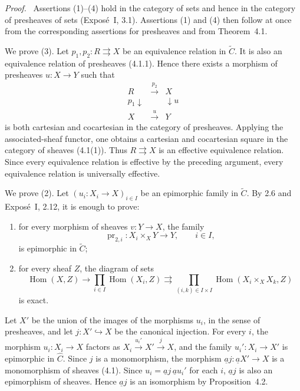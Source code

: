 \documentclass[11pt]{article}
\newcommand{\Hom}{\operatorname{Hom}}
\newenvironment{prooftext}{\par\noindent\emph{Proof.}\ }{\par\medskip}
\begin{document}
\begin{prooftext}
Assertions (1)--(4) hold in the category of sets and hence in the category of presheaves of sets (Expos\'e~I, 3.1). Assertions (1) and (4) then follow at once from the corresponding assertions for presheaves and from Theorem~4.1.

We prove (3). Let \(p_1,p_2:R\rightrightarrows X\) be an equivalence relation in \(\widetilde C\). It is also an equivalence relation of presheaves (4.1.1). Hence there exists a morphism of presheaves \(u:X\to Y\) such that
\[
\begin{array}{ccc}
R&\xrightarrow{p_2}&X\\
{\scriptstyle p_1}\downarrow&&\downarrow{\scriptstyle u}\\
X&\xrightarrow{u}&Y
\end{array}
\]
is both cartesian and cocartesian in the category of presheaves. Applying the associated-sheaf functor, one obtains a cartesian and cocartesian square in the category of sheaves (4.1(1)). Thus \(R\rightrightarrows X\) is an effective equivalence relation. Since every equivalence relation is effective by the preceding argument, every equivalence relation is universally effective.

We prove (2). Let \((u_i:X_i\to X)_{i\in I}\) be an epimorphic family in \(\widetilde C\). By 2.6 and Expos\'e~I, 2.12, it is enough to prove:
\begin{enumerate}[label=\alph*)]
\item for every morphism of sheaves \(v:Y\to X\), the family
\[
\operatorname{pr}_{2,i}:X_i\times_XY\to Y,\qquad i\in I,
\]
is epimorphic in \(\widetilde C\);
\item for every sheaf \(Z\), the diagram of sets
\[
\Hom(X,Z)\longrightarrow \prod_{i\in I}\Hom(X_i,Z)
\rightrightarrows \prod_{(i,k)\in I\times I}\Hom(X_i\times_XX_k,Z)
\]
is exact.
\end{enumerate}

Let \(X'\) be the union of the images of the morphisms \(u_i\), in the sense of presheaves, and let \(j:X'\hookrightarrow X\) be the canonical injection. For every \(i\), the morphism \(u_i:X_i\to X\) factors as \(X_i\xrightarrow{u_i'}X'\xrightarrow{j}X\), and the family \(u_i':X_i\to X'\) is epimorphic in \(\widehat C\). Since \(j\) is a monomorphism, the morphism \(\underline a j:\underline aX'\to X\) is a monomorphism of sheaves (4.1). Since \(u_i=\underline a j\,\underline a u_i'\) for each \(i\), \(\underline a j\) is also an epimorphism of sheaves. Hence \(\underline a j\) is an isomorphism by Proposition~4.2.


\end{prooftext}
\end{document}
